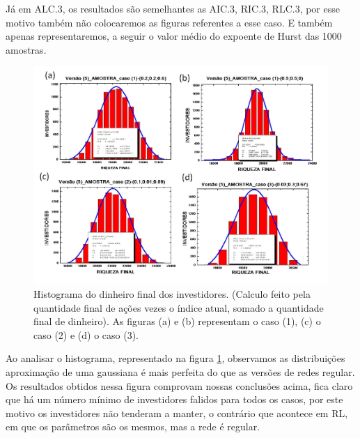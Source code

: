 \documentclass[brazil,ruledheader]{abnt}
\begin{document}
Já em ALC.3, os resultados são semelhantes as AIC.3, RIC.3, RLC.3,
por esse motivo também não colocaremos as figuras referentes a esse caso. E
também apenas representaremos, a seguir o
valor médio do expoente de Hurst das 1000 amostras. 

\begin{figure}[!h]
\centering
\includegraphics[width=.7\linewidth]{Figuras/35.jpg}
\caption{Histograma do dinheiro final dos investidores. (Calculo feito pela
quantidade final de ações vezes o índice atual, somado a quantidade final de
dinheiro). As figuras (a) e (b) representam o caso (1), (c)  o caso (2) e (d) o
caso (3).}
\label{fig:histograma3}
\end{figure}

Ao analisar o histograma, representado na figura \ref{fig:histograma3},
observamos  as distribuições aproximação de uma gaussiana é
mais perfeita do que as versões de redes regular.  Os resultados obtidos nessa
figura comprovam nossas conclusões acima, fica claro que há um número mínimo de
investidores falidos para todos os casos, por este motivo os investidores não
tenderam a manter, o contrário que acontece em RL, em que os
parâmetros são os mesmos, mas a rede é regular.
\end{document}
